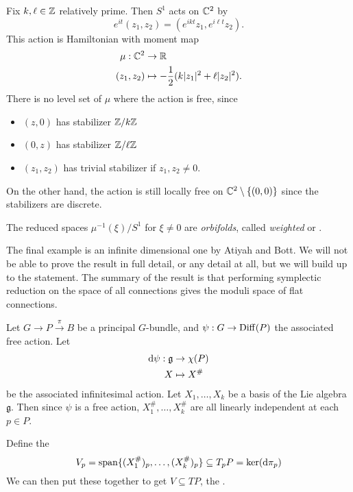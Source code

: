 \documentclass[a4paper]{article}
\begin{document}
\begin{eg}
  Fix $k, \ell \in \mathbb{Z}$ relatively prime. Then $S^1$ acts on $\mathbb{C}^2$ by
  \[
    e^{it} (z_1, z_2) = (e^{ikt} z_1, e^{i\ell t} z_2).
  \]
  This action is Hamiltonian with moment map
  \begin{align*}
    \mu: \mathbb{C}^2 &\to \mathbb{R}\\
    (z_1, z_2) &\mapsto - \frac{1}{2} (k |z_1|^2 + \ell |z_2|^2).
  \end{align*}
  There is no level set of $\mu$ where the action is free, since
  \begin{itemize}
    \item $(z, 0)$ has stabilizer $\mathbb{Z}/k\mathbb{Z}$
    \item $(0, z)$ has stabilizer $\mathbb{Z}/\ell \mathbb{Z}$
    \item $(z_1, z_2)$ has trivial stabilizer if $z_1, z_2 \not= 0$.
  \end{itemize}
  On the other hand, the action is still locally free on $\mathbb{C}^2 \setminus \{(0, 0)\}$ since the stabilizers are discrete.

  The reduced spaces $\mu^{-1}(\xi)/S^1$ for $\xi \not= 0$ are \emph{orbifolds}, called \emph{weighted} or .
\end{eg}

The final example is an infinite dimensional one by Atiyah and Bott. We will not be able to prove the result in full detail, or any detail at all, but we will build up to the statement. The summary of the result is that performing symplectic reduction on the space of all connections gives the moduli space of flat connections.

Let $G \to P \overset{\pi}{\to} B$ be a principal $G$-bundle, and $\psi: G \to \operatorname{Diff}(P)$ the associated free action. Let
\begin{align*}
  \mathrm{d} \psi: \mathfrak{g} &\to \chi(P)\\
  X &\mapsto X^\#
\end{align*}
be the associated infinitesimal action. Let $X_1, \ldots, X_k$ be a basis of the Lie algebra $\mathfrak{g}$. Then since $\psi$ is a free action, $X_1^\#, \ldots, X_k^\#$ are all linearly independent at each $p \in P$.

Define the 
\[
  V_p = \operatorname{span} \{(X_1^\#)_p, \ldots, (X_k^\#)_p\} \subseteq T_p P = \ker (\mathrm{d} \pi_p)
\]
We can then put these together to get $V \subseteq TP$, the .
\end{document}
